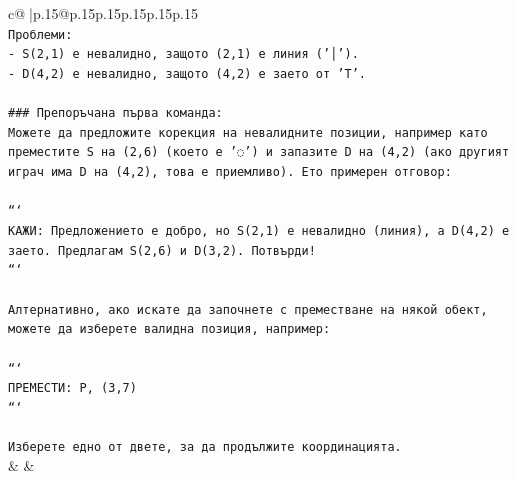 \documentclass{article}
\begin{document}
{\begin{supertabular}{c@{$\;$}|p{.15\linewidth}@{}p{.15\linewidth}p{.15\linewidth}p{.15\linewidth}p{.15\linewidth}p{.15\linewidth}}
{{{\\ 
\texttt{Проблеми:} \\
\texttt{{-} S(2,1) е невалидно, защото (2,1) е линия ('│').} \\
\texttt{{-} D(4,2) е невалидно, защото (4,2) е заето от 'T'.} \\
\\ 
\texttt{\#\#\# Препоръчана първа команда:} \\
\texttt{Можете да предложите корекция на невалидните позиции, например като преместите S на (2,6) (което е '◌') и запазите D на (4,2) (ако другият играч има D на (4,2), това е приемливо). Ето примерен отговор:} \\
\\ 
\texttt{```} \\
\texttt{КАЖИ: Предложението е добро, но S(2,1) е невалидно (линия), а D(4,2) е заето. Предлагам S(2,6) и D(3,2). Потвърди!} \\
\texttt{```} \\
\\ 
\texttt{Алтернативно, ако искате да започнете с преместване на някой обект, можете да изберете валидна позиция, например:} \\
\\ 
\texttt{```} \\
\texttt{ПРЕМЕСТИ: P, (3,7)} \\
\texttt{```} \\
\\ 
\texttt{Изберете едно от двете, за да продължите координацията.} \\
            }
        }
    }
    & & \\ \\


\end{supertabular}}
\end{document}
